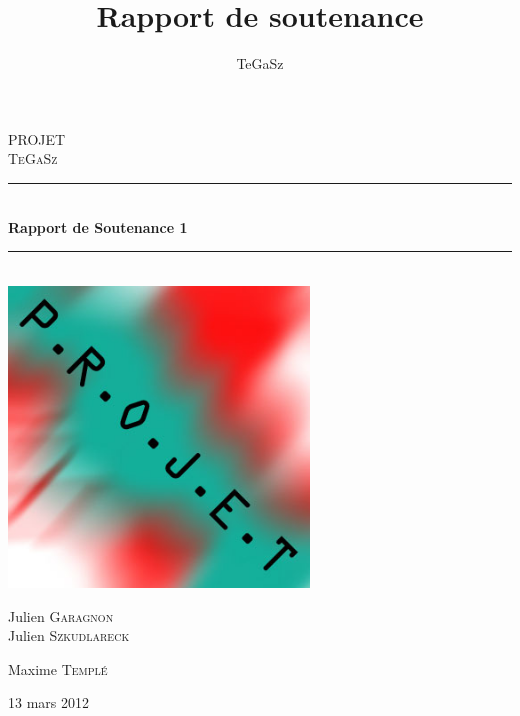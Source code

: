 \documentclass[12pt]{report}
\title{Rapport de soutenance \no{1}}
\date{}
\author{TeGaSz}
\newcommand{\HRule}{\rule{\linewidth}{0.5mm}}
\begin{document}
\begin{titlepage}



\begin{center}



\textsc{\LARGE PROJET}\\[1.5cm]

\textsc{\Large TeGaSz}\\[0.5cm]


\HRule \\[0.4cm]
{ \huge \bfseries Rapport de Soutenance 1}\\[0.4cm]
  
\HRule \\[1.5cm]
\includegraphics[width=0.6\textwidth]{./name.jpg}\\[1cm]  
\begin{minipage}{0.4\textwidth}
\begin{flushleft} \large
Julien \textsc{Garagnon}\\
Julien \textsc{Szkudlareck}
\end{flushleft}
\end{minipage}
\begin{minipage}{0.4\textwidth}
\begin{flushright} \large
Maxime \textsc{Templé}\\

\end{flushright}
\end{minipage}

\vfill

{\large 13 mars 2012}

\end{center}

\end{titlepage}
\end{document}

